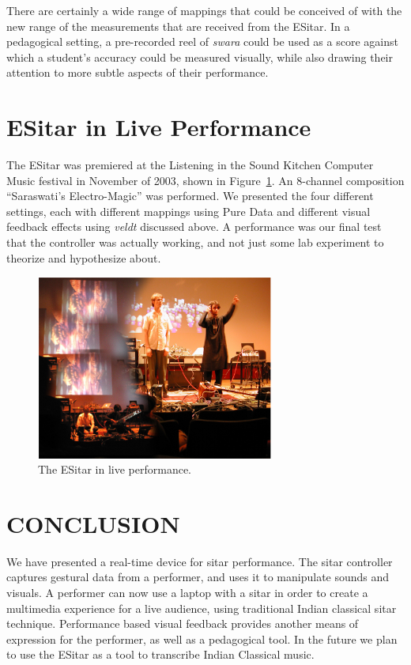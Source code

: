 There are certainly a wide range of mappings that could be conceived of with the
new range of the measurements that are received from the ESitar.  In a
pedagogical setting, a pre-recorded reel of \textit{swara} could be used as a
score against which a student's accuracy could be measured visually, while also
drawing their attention to more subtle aspects of their performance.

\section{ESitar in Live Performance}

The ESitar was premiered at the Listening in the Sound Kitchen Computer
Music festival in November of 2003, shown in Figure~\ref{Kapur:img-10}. An 8-channel composition
``Saraswati's Electro-Magic'' was performed. We presented the four different
settings, each with different mappings using Pure Data and different
visual feedback effects using \textit{veldt} discussed above. A performance was
our final test that the controller was actually working, and not just some lab
experiment to theorize and hypothesize about.


\begin{figure}[t]
\centering
\includegraphics[width=78mm]{img-10-eps-converted-to-crop.pdf}      
\caption{The ESitar in live performance.}
\label{Kapur:img-10}       %
\end{figure}


\section{CONCLUSION}

We have presented a real-time device for sitar performance. The sitar controller captures gestural data from a performer, and uses it to manipulate sounds and visuals. A performer can now use a laptop with a sitar in order to create a multimedia experience for a live audience, using traditional Indian classical sitar technique. Performance based visual feedback provides another means of expression for the performer, as well as a pedagogical tool. In the future we plan to use the ESitar as a tool to transcribe Indian Classical music.


